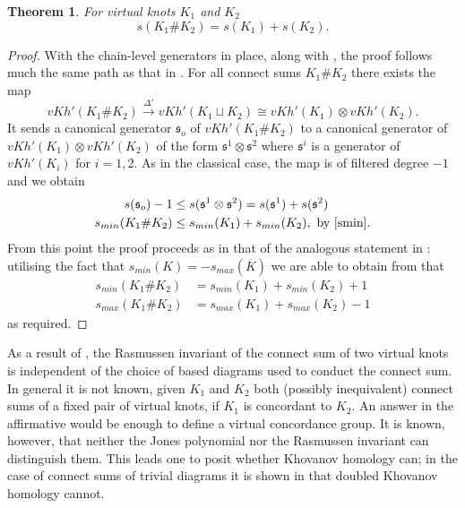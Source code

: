 \documentclass[10pt,oneside]{amsart}
\newtheorem{theorem}{Theorem}[section]
\theoremstyle{definition}
\numberwithin{equation}{section}
\begin{document}
\begin{theorem}
	\label{Thm:additive}
	For virtual knots \( K_1 \) and \( K_2 \)
	\begin{equation}
	s ( K_1 \# K_2 ) = s ( K_1 ) + s ( K_2 ).
	\end{equation}
\end{theorem}

\begin{proof}
	With the chain-level generators in place, along with , the proof follows much the same path as that in \cite{Rasmussen2010}. For all connect sums \( K_1 \# K_2 \) there exists the map
	\begin{equation*}
	{vKh} ' ( K_1 \# K_2 ) \overset{\Delta '}{\longrightarrow} {vKh} ' ( K_1 \sqcup K_2 ) \cong {vKh} ' ( K_1 ) \otimes {vKh} ' ( K_2 ).
	\end{equation*}
	It sends a canonical generator \( {\mathfrak{s}}_o \) of \( {vKh} ' ( K_1 \# K_2 ) \) to a canonical generator of \( {vKh} ' ( K_1 ) \otimes {vKh} ' ( K_2 ) \) of the form \( {\mathfrak{s}}^1 \otimes {\mathfrak{s}}^2 \) where \( {\mathfrak{s}}^i \) is a generator of \( {vKh} ' ( K_i ) \) for \( i = 1, 2 \). As in the classical case, the map is of filtered degree \( -1 \) and we obtain
	\begin{equation}
	\label{add1}
	\begin{aligned}
	s ( {\mathfrak{s}}_o ) - 1 &\leq s ( {\mathfrak{s}}^1 \otimes {\mathfrak{s}}^2 ) = s ( {\mathfrak{s}}^1 ) + s ( {\mathfrak{s}}^2 ) \\
	s_{min} ( K_1 \# K_2 ) &\leq s_{min} ( K_1 ) + s_{min} ( K_2 ), ~\text{by \Cref{smin}}.
	\end{aligned}
	\end{equation}
	From this point the proof proceeds as in that of the analogous statement in \cite{Rasmussen2010}: utilising the fact that \( s_{min} ( K ) = - s_{max} (\overline{K} ) \) we are able to obtain from  that
	\begin{equation*}
	\begin{aligned}
	s_{min} ( K_1 \# K_2 ) &= s_{min} ( K_1 ) + s_{min} ( K_2 ) + 1 \\
	s_{max} ( K_1 \# K_2 ) &= s_{max} ( K_1 ) + s_{max} ( K_2 ) - 1 
	\end{aligned}
	\end{equation*}
	as required.
\end{proof}
As a result of , the Rasmussen invariant of the connect sum of two virtual knots is independent of the choice of based diagrams used to conduct the connect sum. In general it is not known, given \( K_1 \) and \( K_2 \) both (possibly inequivalent) connect sums of a fixed pair of virtual knots, if \( K_1 \) is concordant to \( K_2 \). An answer in the affirmative would be enough to define a virtual concordance group. It is known, however, that neither the Jones polynomial \cite{Manturov2013} nor the Rasmussen invariant can distinguish them. This leads one to posit whether Khovanov homology can; in the case of connect sums of trivial diagrams it is shown in \cite{Rushworth2017} that doubled Khovanov homology cannot.
\end{document}
